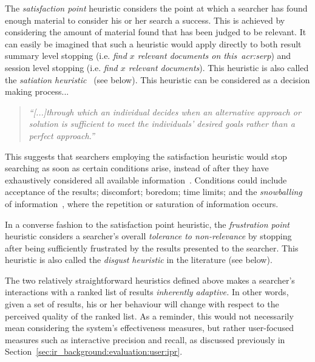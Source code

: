 The \emph{satisfaction point} heuristic considers the point at which a searcher has found enough material to consider his or her search a success. This is achieved by considering the amount of material found that has been judged to be relevant. It can easily be imagined that such a heuristic would apply directly to both result summary level stopping (i.e. \emph{find $x$ relevant documents on this~\gls{acr:serp}}) and session level stopping (i.e. \emph{find $x$ relevant documents}). This heuristic is also called the \emph{satiation heuristic}~\citep{simon1955satiation} (see below). This heuristic can be considered as a decision making process...

\begin{quote}
    \emph{``[...]through which an individual decides when an alternative approach or solution is sufficient to meet the individuals' desired goals rather than a perfect approach.''}
\end{quote}

This suggests that searchers employing the satisfaction heuristic would stop searching as soon as certain conditions arise, instead of after they have exhaustively considered all available information~\citep{march1994primer}. Conditions could include acceptance of the results; discomfort; boredom; time limits; and the \emph{snowballing} of information~\citep{mansourian2007search}, where the repetition or saturation of information occurs.

In a converse fashion to the satisfaction point heuristic, the \emph{frustration point} heuristic considers a searcher's overall \emph{tolerance to non-relevance} by stopping after being sufficiently frustrated by the results presented to the searcher. This heuristic is also called the \emph{disgust heuristic} in the literature (see below).

The two relatively straightforward heuristics defined above makes a searcher's interactions with a ranked list of results \emph{inherently adaptive.} In other words, given a set of results, his or her behaviour will change with respect to the perceived quality of the ranked list. As a reminder, this would not necessarily mean considering the system's effectiveness measures, but rather user-focused measures such as interactive precision and recall, as discussed previously in Section~\ref{sec:ir_background:evaluation:user:ipr}.

